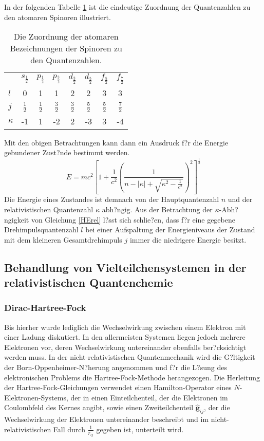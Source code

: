 In der folgenden Tabelle \ref{qzspinor} ist die eindeutige Zuordnung der Quantenzahlen zu den atomaren Spinoren illustriert.

\begin{table}[h]
\centering
\begin{tabular}{lccccccc}
\toprule
        & $s_{\frac12}$ & $p_{\frac12}$ & $p_{\frac32}$ & $d_{\frac32}$ & $d_{\frac52}$ & $f_{\frac52}$ & $f_{\frac72}$\\\vphantom{\rule{0pt}{20pt}}
$l$     & 0            & 1           & 1            & 2            & 2            & 3            & 3\\\vphantom{\rule{0pt}{20pt}}
$j$     & $\frac12$    & $\frac12$   & $\frac32$    & $\frac32$    & $\frac52$    & $\frac52$    & $\frac72$\\\vphantom{\rule{0pt}{20pt}}
$\kappa$& -1           & 1           & -2           & 2            & -3           & 3            & -4\\
\bottomrule
\end{tabular}
\caption{Die Zuordnung der atomaren Bezeichnungen der Spinoren zu den Quantenzahlen.\cite{dyallfaegri}}
\label{qzspinor}
\end{table}

Mit den obigen Betrachtungen kann dann ein Ausdruck f?r die Energie gebundener Zust?nde bestimmt werden.
\begin{equation}\label{HErel}
E = mc^2 \left[1+\frac1{c^2}\left(\frac1{n-|\kappa|+\sqrt{\kappa^2-\frac1{c^2}}}\right)^2\right]^{\frac12}
\end{equation}
Die Energie eines Zustandes ist demnach von der Hauptquantenzahl $n$ und der relativistischen Quantenzahl $\kappa$ abh?ngig.
Aus der Betrachtung der $\kappa$-Abh?ngigkeit von Gleichung \ref{HErel} l?sst sich schlie?en, dass f?r eine gegebene Drehimpulsquantenzahl $l$ bei einer Aufspaltung der Energieniveaus der Zustand mit dem kleineren Gesamtdrehimpuls $j$ immer die niedrigere Energie besitzt.

\subsection{Behandlung von Vielteilchensystemen in der relativistischen Quantenchemie}
\subsubsection{Dirac-Hartree-Fock}
Bis hierher wurde lediglich die Wechselwirkung zwischen einem Elektron mit einer Ladung diskutiert. In den allermeisten Systemen liegen jedoch mehrere Elektronen vor, deren Wechselwirkung untereinander ebenfalls ber?cksichtigt werden muss. In der nicht-relativistischen Quantenmechanik wird die G?ltigkeit der Born-Oppenheimer-N?herung angenommen und f?r die L?sung des elektronischen Problems die Hartree-Fock-Methode herangezogen. Die Herleitung der Hartree-Fock-Gleichungen verwendet einen Hamilton-Operator eines $N$-Elektronen-Systems, der in einen Einteilchenteil, der die Elektronen im Coulombfeld des Kernes angibt, sowie einen Zweiteilchenteil $\mathbf{\hat{g}}_{ij}$, der die Wechselwirkung der Elektronen untereinander beschreibt und im nicht-relativistischen Fall durch $\frac1{r_{ij}}$ gegeben ist, unterteilt wird.

